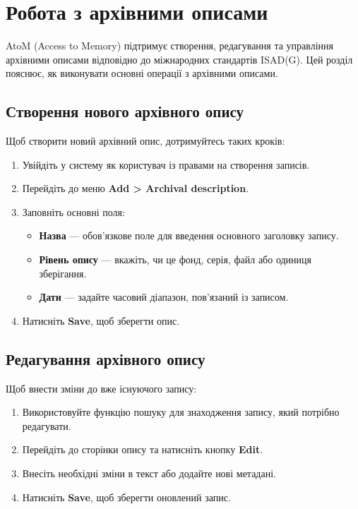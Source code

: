 \documentclass[14pt,a4paper]{article}
\begin{document}
\section{Робота з архівними описами}

AtoM (Access to Memory) підтримує створення, редагування та управління архівними описами відповідно до міжнародних стандартів ISAD(G). Цей розділ пояснює, як виконувати основні операції з архівними описами.

\subsection{Створення нового архівного опису}
Щоб створити новий архівний опис, дотримуйтесь таких кроків:
\begin{enumerate}
	\item Увійдіть у систему як користувач із правами на створення записів.
	\item Перейдіть до меню \textbf{Add > Archival description}.
	\item Заповніть основні поля:
	\begin{itemize}
		\item \textbf{Назва} — обов'язкове поле для введення основного заголовку запису.
		\item \textbf{Рівень опису} — вкажіть, чи це фонд, серія, файл або одиниця зберігання.
		\item \textbf{Дати} — задайте часовий діапазон, пов'язаний із записом.
	\end{itemize}
	\item Натисніть \textbf{Save}, щоб зберегти опис.
\end{enumerate}

\subsection{Редагування архівного опису}
Щоб внести зміни до вже існуючого запису:
\begin{enumerate}
	\item Використовуйте функцію пошуку для знаходження запису, який потрібно редагувати.
	\item Перейдіть до сторінки опису та натисніть кнопку \textbf{Edit}.
	\item Внесіть необхідні зміни в текст або додайте нові метадані.
	\item Натисніть \textbf{Save}, щоб зберегти оновлений запис.
\end{enumerate}
\end{document}
